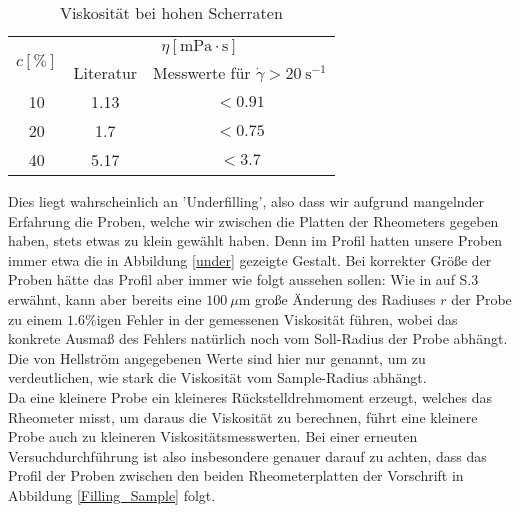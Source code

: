 \documentclass[11pt,a4paper,oneside]{scrartcl}
\begin{document}
\begin{table}[H]
\centering

\begin{tabular}{c|c|c} 
\multirow{2}{*}{$c[\%]$} & \multicolumn{2}{c}{$\eta[\mathrm{mPa\cdot s}]$}         \\ 
\cline{2-3}
                         & Literatur & Messwerte für $\dot\gamma>20\ \mathrm s^{-1}$  \\ 
\hline
10                       & 1.13      & $<0.91$                                       \\
20                       & 1.7       & $<0.75$                                       \\
40                       & 5.17      & $<3.7$                                        \\
\bottomrule
\end{tabular}
\caption{Viskosität bei hohen Scherraten}
\label{table_guido}
\end{table}
Dies liegt wahrscheinlich an 'Underfilling', also dass wir aufgrund mangelnder Erfahrung
die Proben, welche wir zwischen die Platten der Rheometers gegeben haben, stets etwas zu klein gewählt haben. Denn im Profil hatten unsere Proben immer etwa die in Abbildung \ref{under} gezeigte Gestalt. Bei
korrekter Größe der Proben hätte das Profil aber immer wie folgt aussehen sollen:
Wie in \cite{Hellström_2015} auf S.3 erwähnt, kann aber 
bereits eine $100\ \mu \mathrm m$ große Änderung des Radiuses $r$ der Probe zu einem $1.6\%$igen  Fehler in der gemessenen Viskosität führen, wobei das konkrete Ausmaß des Fehlers natürlich noch vom Soll-Radius der Probe abhängt. Die von Hellström angegebenen Werte sind hier nur genannt, um zu verdeutlichen, wie stark die Viskosität vom Sample-Radius abhängt.\\
Da eine kleinere Probe ein kleineres Rückstelldrehmoment erzeugt,
welches das Rheometer misst, um daraus die Viskosität zu berechnen, führt eine kleinere Probe auch zu kleineren Viskositätsmesswerten. Bei einer erneuten Versuchdurchführung ist also insbesondere genauer darauf zu achten,
dass das Profil der Proben zwischen den beiden Rheometerplatten der Vorschrift in Abbildung \ref{Filling_Sample} folgt.
\end{document}
